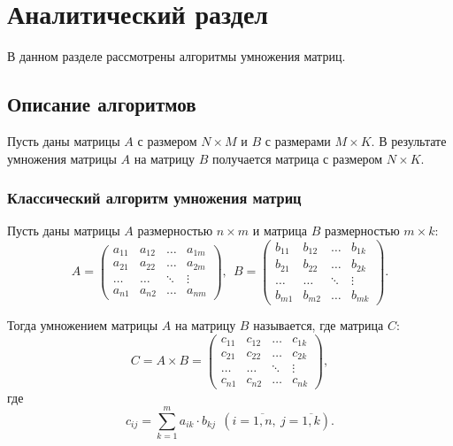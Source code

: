 \chapter{Аналитический раздел}

В данном разделе рассмотрены алгоритмы умножения матриц.

\section{Описание алгоритмов}

Пусть даны матрицы $A$ с размером $N\times M$ и $B$ с размерами $M \times K$. В результате умножения матрицы $A$ на матрицу $B$ получается матрица с размером $N \times K$.

\subsection{Классический алгоритм умножения матриц}

Пусть даны матрицы $A$ размерностью  $n\times m$ и матрица $B$ размерностью  $m\times k$:
\begin{equation}
    A = 
\begin{pmatrix}
    a_{11} & a_{12} & \ldots & a_{1m} \\
    a_{21} & a_{22} & \ldots & a_{2m} \\
    \hdots & \hdots & \ddots & \vdots \\
    a_{n1} & a_{n2} & \ldots & a_{nm}
\end{pmatrix}, \ \
    B = 
\begin{pmatrix}
    b_{11} & b_{12} & \ldots & b_{1k} \\
    b_{21} & b_{22} & \ldots & b_{2k} \\
    \hdots & \hdots & \ddots & \vdots \\
    b_{m1} & b_{m2} & \ldots & b_{mk}
\end{pmatrix}.
\end{equation}

\medskip

Тогда умножением матрицы $A$ на матрицу  $B$ называется, где матрица $C$:
\begin{equation}
    C = A\times B =
\begin{pmatrix}
    c_{11} & c_{12} & \ldots & c_{1k} \\
    c_{21} & c_{22} & \ldots & c_{2k} \\
    \hdots & \hdots & \ddots & \vdots \\
    c_{n1} & c_{n2} & \ldots & c_{nk}
\end{pmatrix},
\end{equation}
где
\begin{equation}
    c_{ij} = \sum\limits_{k=1}^{m} a_{ik} \cdot b_{kj} \ \ (i = \overline{1,n}, \
    j = \overline{1,k}).
\end{equation}


